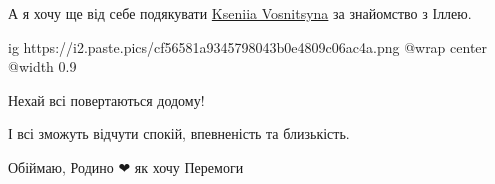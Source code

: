 А я хочу ще від себе подякувати \href{https://www.facebook.com/profile.php?id=100008632894231}{Kseniia Vosnitsyna} за знайомство з Іллею.\par

\ifcmt
  ig https://i2.paste.pics/cf56581a9345798043b0e4809c06ac4a.png
  @wrap center
  @width 0.9
\fi


Нехай всі повертаються додому!\par
І всі зможуть відчути спокій, впевненість та близькість.\par
Обіймаю, Родино ❤ як хочу Перемоги\par
